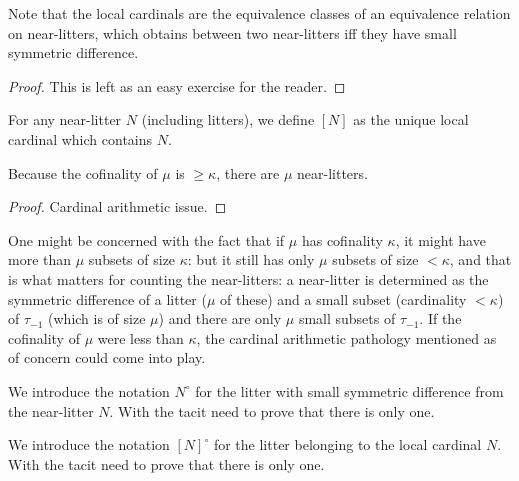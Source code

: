 \begin{lemma}
\label {lem:small-diff-equiv} 
Note that the local cardinals are the equivalence classes of an equivalence relation on near-litters, which obtains between two near-litters iff they have small symmetric difference.
\end{lemma}

\begin{proof}
This is left as an easy exercise for the reader.
\end{proof}

\begin{definition}
\label {def:local-cardinal-of} 
For any near-litter $N$ (including litters), we define $[N]$ as the unique local cardinal which contains $N$.
\end{definition}

\begin{lemma}
\label {lem:count-near-litters}     

Because the cofinality of $\mu$ is $\geq \kappa$, there are $\mu$ near-litters.
\end{lemma}

\begin{proof}
Cardinal arithmetic issue.
\end{proof}

One might be concerned with the fact that if $\mu$ has cofinality $\kappa$, it might have more than $\mu$ subsets of size $\kappa$:  but it still has only $\mu$ subsets of size $<\kappa$, and that is what matters for counting the near-litters:  a near-litter is determined as the symmetric difference of a litter ($\mu$ of these) and a small subset (cardinality $<\kappa$) of $\tau_{-1}$ (which is of size $\mu$) and there are only $\mu$ small subsets of $\tau_{-1}$.  If the cofinality of $\mu$ were less than $\kappa$, the cardinal arithmetic pathology mentioned as of concern could come into play.

\begin{definition}
\label {def:the-litter-near}   
We introduce the notation $N^\circ$ for the litter with small symmetric difference from the near-litter $N$.
With the tacit need to prove that there is only one.
\end{definition}

\begin{definition}
\label {def:the-litter-in}     
We introduce the notation $[N]^\circ$ for the litter belonging to the local cardinal $N$.  With the tacit need to prove that there is only one.
\end{definition}

